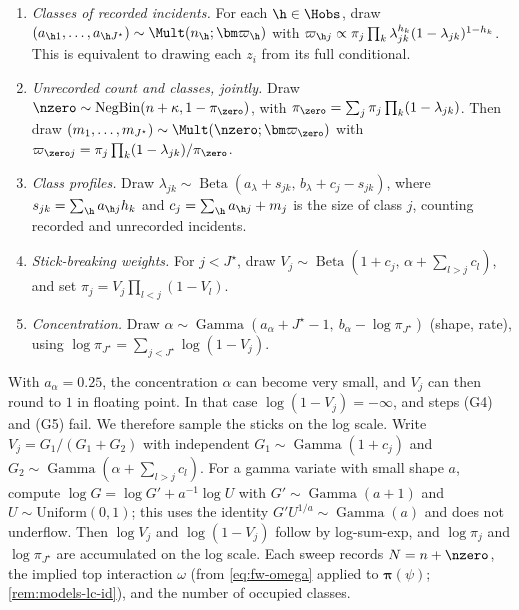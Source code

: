 \begin{enumerate}[({G}1)]
  \item \emph{Classes of recorded incidents.} For each $\h\in\Hobs$, draw $(a_{\h1},\dots,a_{\h J^\star})\sim\Mult(n_{\h};\bm\varpi_{\h})$ with $\varpi_{\h j}\propto\pi_j\prod_k\lambda_{jk}^{h_k}(1-\lambda_{jk})^{1-h_k}$. This is equivalent to drawing each $z_i$ from its full conditional.
  \item \emph{Unrecorded count and classes, jointly.} Draw $\nzero\sim\operatorname{NegBin}(n+\kappa,1-\pi_{\zero})$, with $\pi_{\zero}=\sum_j\pi_j\prod_k(1-\lambda_{jk})$. Then draw $(m_1,\dots,m_{J^\star})\sim\Mult(\nzero;\bm\varpi_{\zero})$ with $\varpi_{\zero j}=\pi_j\prod_k(1-\lambda_{jk})/\pi_{\zero}$.
  \item \emph{Class profiles.} Draw $\lambda_{jk}\sim\operatorname{Beta}(a_\lambda+s_{jk},\,b_\lambda+c_j-s_{jk})$, where $s_{jk}=\sum_{\h}a_{\h j}h_k$ and $c_j=\sum_{\h}a_{\h j}+m_j$ is the size of class $j$, counting recorded and unrecorded incidents.
  \item \emph{Stick-breaking weights.} For $j<J^\star$, draw $V_j\sim\operatorname{Beta}(1+c_j,\,\alpha+\sum_{l>j}c_l)$, and set $\pi_j=V_j\prod_{l<j}(1-V_l)$.
  \item \emph{Concentration.} Draw $\alpha\sim\operatorname{Gamma}(a_\alpha+J^\star-1,\ b_\alpha-\log\pi_{J^\star})$ (shape, rate), using $\log\pi_{J^\star}=\sum_{j<J^\star}\log(1-V_j)$.
\end{enumerate}
With $a_\alpha=0.25$, the concentration $\alpha$ can become very small, and $V_j$ can then round to $1$ in floating point. In that case $\log(1-V_j)=-\infty$, and steps (G4) and (G5) fail. We therefore sample the sticks on the log scale. Write $V_j=G_1/(G_1+G_2)$ with independent $G_1\sim\operatorname{Gamma}(1+c_j)$ and $G_2\sim\operatorname{Gamma}(\alpha+\sum_{l>j}c_l)$. For a gamma variate with small shape $a$, compute $\log G=\log G'+a^{-1}\log U$ with $G'\sim\operatorname{Gamma}(a+1)$ and $U\sim\mathrm{Uniform}(0,1)$; this uses the identity $G'U^{1/a}\sim\operatorname{Gamma}(a)$ and does not underflow. Then $\log V_j$ and $\log(1-V_j)$ follow by log-sum-exp, and $\log\pi_j$ and $\log\pi_{J^\star}$ are accumulated on the log scale. Each sweep records $N=n+\nzero$, the implied top interaction $\omega$ (from \eqref{eq:fw-omega} applied to $\bm\pi(\psi)$; \cref{rem:models-lc-id}), and the number of occupied classes.

